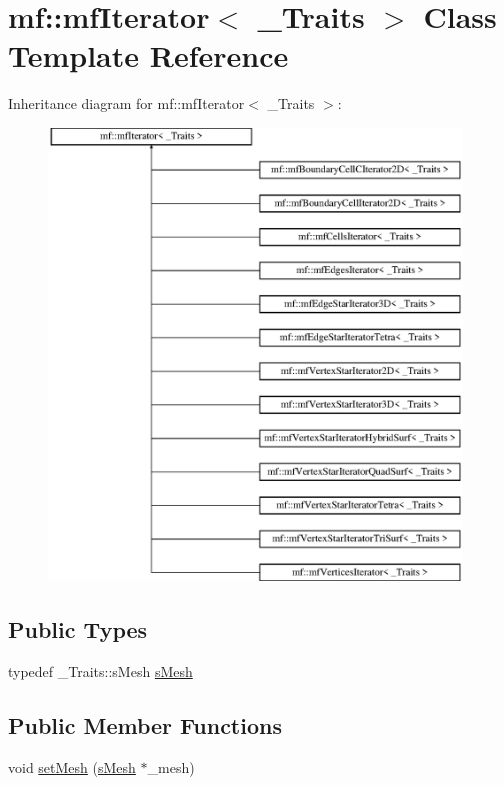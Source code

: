 \hypertarget{classmf_1_1mfIterator}{
\section{mf::mfIterator$<$ \_\-Traits $>$ Class Template Reference}
\label{classmf_1_1mfIterator}
}
Inheritance diagram for mf::mfIterator$<$ \_\-Traits $>$:\begin{figure}[H]
\begin{center}
\leavevmode
\includegraphics[height=12.000000cm]{classmf_1_1mfIterator}
\end{center}
\end{figure}
\subsection*{Public Types}
\begin{DoxyCompactItemize}
\item 
typedef \_\-Traits::sMesh \hyperlink{classmf_1_1mfIterator_aca31e4d7e7eca4e3b100530d8725064b}{sMesh}
\end{DoxyCompactItemize}
\subsection*{Public Member Functions}
\begin{DoxyCompactItemize}
\item 
void \hyperlink{classmf_1_1mfIterator_aae09ea9494442bf0a634d6d1d4cc7375}{setMesh} (\hyperlink{classmf_1_1mfIterator_aca31e4d7e7eca4e3b100530d8725064b}{sMesh} $\ast$\_\-mesh)
\end{DoxyCompactItemize}

